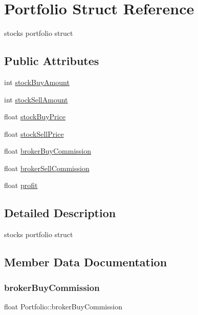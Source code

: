 \hypertarget{structPortfolio}{}\section{Portfolio Struct Reference}
\label{structPortfolio}


stock\textquotesingle{}s portfolio struct  


\subsection*{Public Attributes}
\begin{DoxyCompactItemize}
\item 
int \mbox{\hyperlink{structPortfolio_a1ebd56f9eabd5e4801d662c1149a9b68}{stock\+Buy\+Amount}}
\item 
int \mbox{\hyperlink{structPortfolio_a2df591b7bc8ade758df5c074451728a8}{stock\+Sell\+Amount}}
\item 
float \mbox{\hyperlink{structPortfolio_a80d29194fc6fba22e11a6fb44890cedf}{stock\+Buy\+Price}}
\item 
float \mbox{\hyperlink{structPortfolio_ac920982854f6d7b0e84cb0610a0482ce}{stock\+Sell\+Price}}
\item 
float \mbox{\hyperlink{structPortfolio_a9146b82260bdb8a78fa66bb6abf62098}{broker\+Buy\+Commission}}
\item 
float \mbox{\hyperlink{structPortfolio_aa5dddddfe5ebf64c3fa3504da27f7a52}{broker\+Sell\+Commission}}
\item 
float \mbox{\hyperlink{structPortfolio_a49eb0a23a7afd05bfbcf235b5a706530}{profit}}
\end{DoxyCompactItemize}


\subsection{Detailed Description}
stock\textquotesingle{}s portfolio struct 

\subsection{Member Data Documentation}
\mbox{\label{structPortfolio_a9146b82260bdb8a78fa66bb6abf62098}} 
\subsubsection{\texorpdfstring{brokerBuyCommission}{brokerBuyCommission}}
{\footnotesize\ttfamily float Portfolio\+::broker\+Buy\+Commission}

